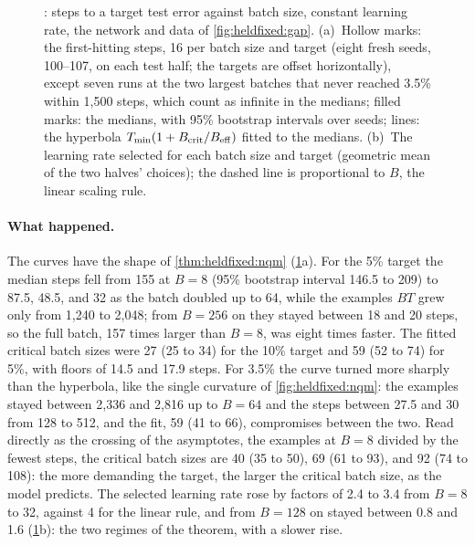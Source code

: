 \begin{refsection}
\begin{figure}[t]
\begin{fullwidth}
\smallskip
{}
\caption{: steps to a target test error against batch size, constant learning rate, the network and data of \cref{fig:heldfixed:gap}. (a)~Hollow marks: the first-hitting steps, 16 per batch size and target (eight fresh seeds, 100--107, on each test half; the targets are offset horizontally), except seven runs at the two largest batches that never reached 3.5\% within 1,500 steps, which count as infinite in the medians; filled marks: the medians, with 95\% bootstrap intervals over seeds; lines: the hyperbola $T_{\min}(1+B_{\mathrm{crit}}/B_{\mathrm{eff}})$ fitted to the medians. (b)~The learning rate selected for each batch size and target (geometric mean of the two halves' choices); the dashed line is proportional to $B$, the linear scaling rule.}
\label{fig:heldfixed:steps}
\end{fullwidth}
\end{figure}

\paragraph{What happened.} The curves have the shape of \cref{thm:heldfixed:nqm} (\cref{fig:heldfixed:steps}a). For the 5\% target the median steps fell from 155 at $B=8$ (95\% bootstrap interval 146.5 to 209) to 87.5, 48.5, and 32 as the batch doubled up to 64, while the examples $BT$ grew only from 1,240 to 2,048; from $B=256$ on they stayed between 18 and 20 steps, so the full batch, 157 times larger than $B=8$, was eight times faster. The fitted critical batch sizes were 27 (25 to 34) for the 10\% target and 59 (52 to 74) for 5\%, with floors of 14.5 and 17.9 steps. For 3.5\% the curve turned more sharply than the hyperbola, like the single curvature of \cref{fig:heldfixed:nqm}: the examples stayed between 2,336 and 2,816 up to $B=64$ and the steps between 27.5 and 30 from 128 to 512, and the fit, 59 (41 to 66), compromises between the two. Read directly as the crossing of the asymptotes, the examples at $B=8$ divided by the fewest steps, the critical batch sizes are 40 (35 to 50), 69 (61 to 93), and 92 (74 to 108): the more demanding the target, the larger the critical batch size, as the model predicts. The selected learning rate rose by factors of 2.4 to 3.4 from $B=8$ to 32, against 4 for the linear rule, and from $B=128$ on stayed between 0.8 and 1.6 (\cref{fig:heldfixed:steps}b): the two regimes of the theorem, with a slower rise.


\end{refsection}
